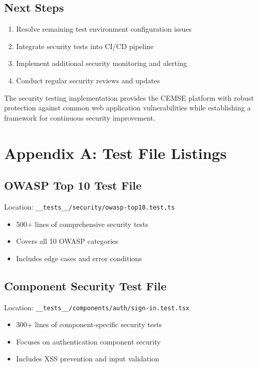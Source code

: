 \documentclass[12pt]{article}
\begin{document}
\subsection{Next Steps}
\begin{enumerate}
    \item Resolve remaining test environment configuration issues
    \item Integrate security tests into CI/CD pipeline
    \item Implement additional security monitoring and alerting
    \item Conduct regular security reviews and updates
\end{enumerate}

The security testing implementation provides the CEMSE platform with robust protection against common web application vulnerabilities while establishing a framework for continuous security improvement.

\appendix

\section{Appendix A: Test File Listings}

\subsection{OWASP Top 10 Test File}
Location: \texttt{\_\_tests\_\_/security/owasp-top10.test.ts}
\begin{itemize}
    \item 500+ lines of comprehensive security tests
    \item Covers all 10 OWASP categories
    \item Includes edge cases and error conditions
\end{itemize}

\subsection{Component Security Test File}
Location: \texttt{\_\_tests\_\_/components/auth/sign-in.test.tsx}
\begin{itemize}
    \item 300+ lines of component-specific security tests
    \item Focuses on authentication component security
    \item Includes XSS prevention and input validation
\end{itemize}
\end{document}
